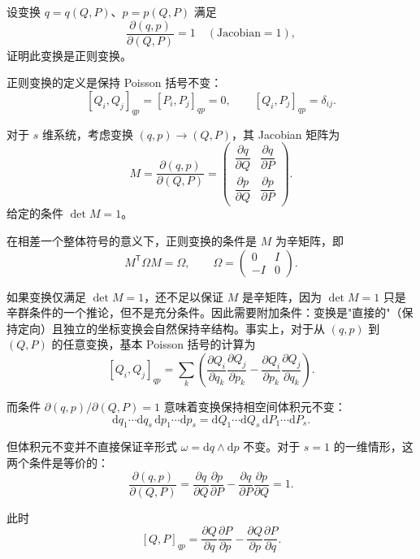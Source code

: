 \begin{question}
设变换 \(q = q(Q,P)\)、\(p = p(Q,P)\) 满足
\[
\frac{\partial(q,p)}{\partial(Q,P)} = 1\quad (\text{Jacobian}=1),
\]
证明此变换是正则变换。
\begin{solution}
正则变换的定义是保持 Poisson 括号不变：
\[
[Q_i,Q_j]_{qp} = [P_i,P_j]_{qp} = 0,\qquad
[Q_i,P_j]_{qp} = \delta_{ij}.
\]

对于 \(s\) 维系统，考虑变换 \((q,p) \to (Q,P)\)，其 Jacobian 矩阵为
\[
M = \frac{\partial(q,p)}{\partial(Q,P)} =
\begin{pmatrix}
\dfrac{\partial q}{\partial Q} & \dfrac{\partial q}{\partial P} \\[8pt]
\dfrac{\partial p}{\partial Q} & \dfrac{\partial p}{\partial P}
\end{pmatrix}.
\]
给定的条件 \(\det M = 1\)。

在相差一个整体符号的意义下，正则变换的条件是 \(M\) 为辛矩阵，即
\[
M^\mathsf T \Omega M = \Omega,\qquad
\Omega = \begin{pmatrix} 0 & I \\ -I & 0 \end{pmatrix}.
\]

如果变换仅满足 \(\det M = 1\)，还不足以保证 \(M\) 是辛矩阵，因为 \(\det M = 1\) 只是辛群条件的一个推论，但不是充分条件。因此需要附加条件：变换是"直接的"（保持定向）且独立的坐标变换会自然保持辛结构。事实上，对于从 \((q,p)\) 到 \((Q,P)\) 的任意变换，基本 Poisson 括号的计算为
\[
[Q_i, Q_j]_{qp} = \sum_k\left(
\frac{\partial Q_i}{\partial q_k}\frac{\partial Q_j}{\partial p_k}
- \frac{\partial Q_i}{\partial p_k}\frac{\partial Q_j}{\partial q_k}
\right).
\]

而条件 \(\partial(q,p)/\partial(Q,P)=1\) 意味着变换保持相空间体积元不变：
\[
\mathrm dq_1\cdots\mathrm dq_s\,\mathrm dp_1\cdots\mathrm dp_s
= \mathrm dQ_1\cdots\mathrm dQ_s\,\mathrm dP_1\cdots\mathrm dP_s.
\]

但体积元不变并不直接保证辛形式 \(\omega = \mathrm dq\wedge\mathrm dp\) 不变。对于 \(s=1\) 的一维情形，这两个条件是等价的：
\[
\frac{\partial(q,p)}{\partial(Q,P)} = \frac{\partial q}{\partial Q}\frac{\partial p}{\partial P}
- \frac{\partial q}{\partial P}\frac{\partial p}{\partial Q} = 1.
\]

此时
\[
[Q,P]_{qp} = \frac{\partial Q}{\partial q}\frac{\partial P}{\partial p}
- \frac{\partial Q}{\partial p}\frac{\partial P}{\partial q}.
\]


\end{solution}
\end{question}
